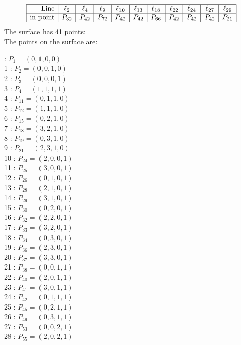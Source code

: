 \documentclass{article}
\begin{document}
{$$\begin{array}{|r*{10}{|c}|}
\hline
\mbox{Line}  & \ell_{2} & \ell_{4} & \ell_{9} & \ell_{10} & \ell_{13} & \ell_{18} & \ell_{22} & \ell_{24} & \ell_{27} & \ell_{29}\\
\hline
\mbox{in point}  & P_{32} & P_{42} & P_{72} & P_{42} & P_{42} & P_{66} & P_{42} & P_{42} & P_{42} & P_{21}\\
\hline
\end{array}
$$
The surface has 41 points:\\
The points on the surface are:\\
\begin{multicols}{3}
 : $P_{1}=( 0, 1, 0, 0 )$\\
1 : $P_{2}=( 0, 0, 1, 0 )$\\
2 : $P_{3}=( 0, 0, 0, 1 )$\\
3 : $P_{4}=( 1, 1, 1, 1 )$\\
4 : $P_{11}=( 0, 1, 1, 0 )$\\
5 : $P_{12}=( 1, 1, 1, 0 )$\\
6 : $P_{15}=( 0, 2, 1, 0 )$\\
7 : $P_{18}=( 3, 2, 1, 0 )$\\
8 : $P_{19}=( 0, 3, 1, 0 )$\\
9 : $P_{21}=( 2, 3, 1, 0 )$\\
10 : $P_{24}=( 2, 0, 0, 1 )$\\
11 : $P_{25}=( 3, 0, 0, 1 )$\\
12 : $P_{26}=( 0, 1, 0, 1 )$\\
13 : $P_{28}=( 2, 1, 0, 1 )$\\
14 : $P_{29}=( 3, 1, 0, 1 )$\\
15 : $P_{30}=( 0, 2, 0, 1 )$\\
16 : $P_{32}=( 2, 2, 0, 1 )$\\
17 : $P_{33}=( 3, 2, 0, 1 )$\\
18 : $P_{34}=( 0, 3, 0, 1 )$\\
19 : $P_{36}=( 2, 3, 0, 1 )$\\
20 : $P_{37}=( 3, 3, 0, 1 )$\\
21 : $P_{38}=( 0, 0, 1, 1 )$\\
22 : $P_{40}=( 2, 0, 1, 1 )$\\
23 : $P_{41}=( 3, 0, 1, 1 )$\\
24 : $P_{42}=( 0, 1, 1, 1 )$\\
25 : $P_{45}=( 0, 2, 1, 1 )$\\
26 : $P_{49}=( 0, 3, 1, 1 )$\\
27 : $P_{53}=( 0, 0, 2, 1 )$\\
28 : $P_{55}=( 2, 0, 2, 1 )$\\

\end{multicols}}
\end{document}
